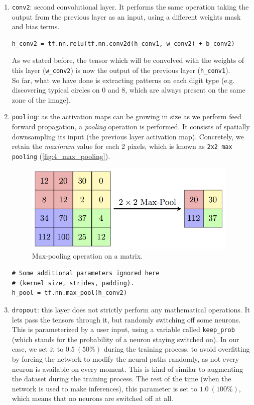 \begin{enumerate}
			
			\item \texttt{conv2}: second convolutional layer. It performs the same operation taking the output from the previous layer as an input, using a different weights mask and bias terms.
			
			\begin{lstlisting}
h_conv2 = tf.nn.relu(tf.nn.conv2d(h_conv1, w_conv2) + b_conv2)
			\end{lstlisting}
			As we stated before, the tensor which will be convolved with the weights of this layer (\texttt{w\_conv2}) is now the output of the previous layer (\texttt{h\_conv1}).\\
			
			So far, what we have done is extracting patterns on each digit type (e.g. discovering typical circles on $0$ and $8$, which are always present on the same zone of the image).\\
			
			\item \texttt{pooling}: as the activation maps can be growing in size as we perform feed forward propagation, a \emph{pooling} operation is performed. It consists of spatially downsampling its input (the previous layer activation map). Concretely, we retain the \textit{maximum} value for each 2 pixels, which is known as \texttt{2x2 max pooling} (\autoref{fig:4_max_pooling}).
			
			\begin{figure}[h]
				\centering
				\includegraphics[width=4in]{images/max_pool}
				\caption{Max-pooling operation on a matrix.}
				\label{fig:4_max_pooling}
			\end{figure}
			
			\begin{lstlisting}
# Some additional parameters ignored here
# (kernel size, strides, padding).
h_pool = tf.nn.max_pool(h_conv2)
			\end{lstlisting}
			
			\item \texttt{dropout}: this layer does not strictly perform any mathematical operations. It lets pass the tensors through it, but randomly switching off some neurons. This is parameterized by a user input, using a variable called \texttt{keep\_prob} (which stands for the probability of a neuron staying switched on). In our case, we set it to $0.5 \ (50\%)$ during the training process, to avoid overfitting by forcing the network to modify the neural paths randomly, as not every neuron is available on every moment. This is kind of similar to augmenting the dataset during the training process. The rest of the time (when the network is used to make inferences), this parameter is set to $1.0 \ (100\%)$, which means that no neurons are switched off at all.\\
			

\end{enumerate}
